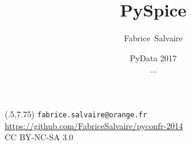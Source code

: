 





\title[]{PySpice}
\author[F.~Salvaire]{Fabrice~Salvaire}
\date[00 jun 17]{PyData 2017 \\ {\tiny ...}}



\newcommand{\Cpp}{C\nolinebreak[4]\hspace{-.05em}\raisebox{.4ex}{\tiny\bf ++}}




%
%

\begin{frame} %
  \titlepage
  \begin{textblock}{12}(.5,7.75)
    \tiny%
    \texttt{fabrice.salvaire@orange.fr} \\
    \url{https://github.com/FabriceSalvaire/pyconfr-2014} \\
    CC BY-NC-SA 3.0
  \end{textblock}
\end{frame}

\logo{} %

%
%


